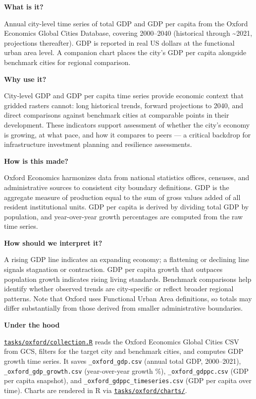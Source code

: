 \documentclass[
  letterpaper,
  DIV=11,
  numbers=noendperiod]{scrreprt}
\begin{document}
\textbf{What is it?}

Annual city-level time series of total GDP and GDP per capita from the
Oxford Economics Global Cities Database, covering 2000--2040 (historical
through \textasciitilde2021, projections thereafter). GDP is reported in
real US dollars at the functional urban area level. A companion chart
places the city's GDP per capita alongside benchmark cities for regional
comparison.

\textbf{Why use it?}

City-level GDP and GDP per capita time series provide economic context
that gridded rasters cannot: long historical trends, forward projections
to 2040, and direct comparisons against benchmark cities at comparable
points in their development. These indicators support assessment of
whether the city's economy is growing, at what pace, and how it compares
to peers --- a critical backdrop for infrastructure investment planning
and resilience assessments.

\textbf{How is this made?}

Oxford Economics harmonizes data from national statistics offices,
censuses, and administrative sources to consistent city boundary
definitions. GDP is the aggregate measure of production equal to the sum
of gross values added of all resident institutional units. GDP per
capita is derived by dividing total GDP by population, and
year-over-year growth percentages are computed from the raw time series.

\textbf{How should we interpret it?}

A rising GDP line indicates an expanding economy; a flattening or
declining line signals stagnation or contraction. GDP per capita growth
that outpaces population growth indicates rising living standards.
Benchmark comparisons help identify whether observed trends are
city-specific or reflect broader regional patterns. Note that Oxford
uses Functional Urban Area definitions, so totals may differ
substantially from those derived from smaller administrative boundaries.

\textbf{Under the hood}

\href{../tasks/oxford/collection.R}{\texttt{tasks/oxford/collection.R}}
reads the Oxford Economics Global Cities CSV from GCS, filters for the
target city and benchmark cities, and computes GDP growth time series.
It saves \texttt{\_oxford\_gdp.csv} (annual total GDP, 2000--2021),
\texttt{\_oxford\_gdp\_growth.csv} (year-over-year growth \%),
\texttt{\_oxford\_gdppc.csv} (GDP per capita snapshot), and
\texttt{\_oxford\_gdppc\_timeseries.csv} (GDP per capita over time).
Charts are rendered in R via
\href{../tasks/oxford/charts/}{\texttt{tasks/oxford/charts/}}.
\end{document}

